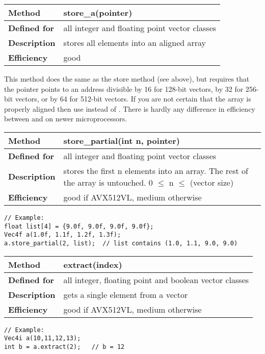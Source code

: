\documentclass[vcl_manual.tex]{subfiles}
\begin{document}
\begin{tabular}{|p{25mm}|p{100mm}|}
\hline
\bfseries Method & store\_a(pointer) \\ \hline
\bfseries Defined for & all integer and floating point vector classes \\ \hline
\bfseries Description & stores all elements into an aligned array \\ \hline
\bfseries Efficiency & good \\ \hline
\end{tabular}

This method does the same as the store method (see above), but requires that the pointer points to an address divisible by 16 for 128-bit vectors, by 32 for 256-bit vectors, or by 64 for 512-bit vectors. If you are not certain that the array is properly aligned then use  instead of .
There is hardly any difference in efficiency between  and  on newer microprocessors.


\begin{tabular}{|p{25mm}|p{100mm}|}
\hline
\bfseries Method & store\_partial(int n, pointer) \\ \hline
\bfseries Defined for & all integer and floating point vector classes \\ \hline
\bfseries Description & stores the first n elements into an array. The rest of the array is untouched. 
0 $\leq$ n $\leq$ (vector size) \\ \hline
\bfseries Efficiency & good if AVX512VL, medium otherwise \\ \hline
\end{tabular}
\begin{lstlisting}[frame=none]
// Example:
float list[4] = {9.0f, 9.0f, 9.0f, 9.0f};
Vec4f a(1.0f, 1.1f, 1.2f, 1.3f);
a.store_partial(2, list);  // list contains (1.0, 1.1, 9.0, 9.0)
\end{lstlisting}

\begin{tabular}{|p{25mm}|p{100mm}|}
\hline
\bfseries Method & extract(index) \\ \hline
\bfseries Defined for & all integer, floating point and boolean vector classes \\ \hline
\bfseries Description & gets a single element from a vector \\ \hline
\bfseries Efficiency & good if AVX512VL, medium otherwise \\ \hline
\end{tabular}
\begin{lstlisting}[frame=none]
// Example:
Vec4i a(10,11,12,13);
int b = a.extract(2);   // b = 12
\end{lstlisting}
\end{document}
